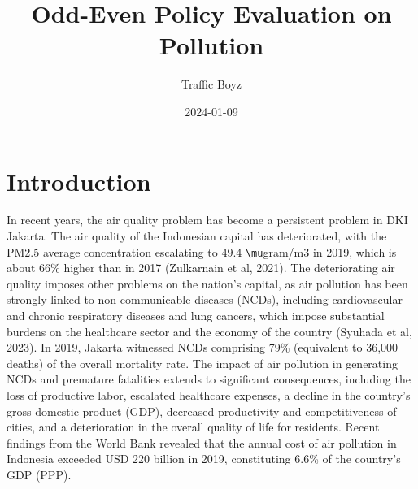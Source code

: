 \documentclass[
]{article}
\title{Odd-Even Policy Evaluation on Pollution}
\author{Traffic Boyz}
\date{2024-01-09}
\begin{document}
\maketitle

\hypertarget{introduction}{%
\section{Introduction}\label{introduction}}

In recent years, the air quality problem has become a persistent problem
in DKI Jakarta. The air quality of the Indonesian capital has
deteriorated, with the PM2.5 average concentration escalating to 49.4
\texttt{\textbackslash{}mu}gram/m3 in 2019, which is about 66\% higher
than in 2017 (Zulkarnain et al, 2021). The deteriorating air quality
imposes other problems on the nation's capital, as air pollution has
been strongly linked to non-communicable diseases (NCDs), including
cardiovascular and chronic respiratory diseases and lung cancers, which
impose substantial burdens on the healthcare sector and the economy of
the country (Syuhada et al, 2023). In 2019, Jakarta witnessed NCDs
comprising 79\% (equivalent to 36,000 deaths) of the overall mortality
rate. The impact of air pollution in generating NCDs and premature
fatalities extends to significant consequences, including the loss of
productive labor, escalated healthcare expenses, a decline in the
country's gross domestic product (GDP), decreased productivity and
competitiveness of cities, and a deterioration in the overall quality of
life for residents. Recent findings from the World Bank revealed that
the annual cost of air pollution in Indonesia exceeded USD 220 billion
in 2019, constituting 6.6\% of the country's GDP (PPP).
\end{document}

